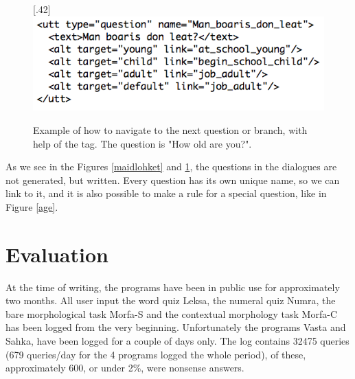 \documentclass[11pt]{article}
\begin{document}
\begin{figure}[htbp]
\begin{center}
\scalebox{.42}[.42]{\includegraphics{presentation/img/Man_boarisEng.png}}\\
\caption{Example of how to navigate to the next question or branch, with help of the tag. The question is "How old are you?".}
\label{branch}
\end{center}
\end{figure}

As we see in the Figures \ref{maidlohket} and \ref{branch}, the questions in the dialogues are not generated, but written. Every question has its own unique name, so we can link to it, and it is also possible to make a rule for a special question, like in Figure \ref{age}.  



\section{Evaluation}

At the time of writing, the programs have been in public use for approximately two months. %
All user input the word quiz Leksa, the numeral quiz Numra, the bare morphological task Morfa-S and the contextual morphology task Morfa-C has been logged from the very beginning. Unfortunately the programs Vasta and Sahka, have been logged for a couple of days only. The log contains 32475 queries (679 queries/day for the 4 programs logged the whole period), of these, approximately 600, or under 2\%, were nonsense answers. 
\end{document}
